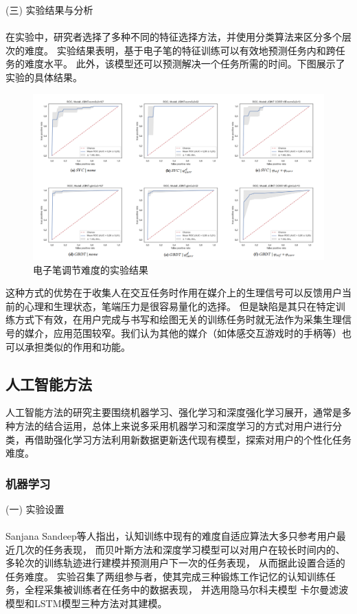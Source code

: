 \documentclass{article}
\begin{document}
            (三) 实验结果与分析\paragraph{}
            在实验中，研究者选择了多种不同的特征选择方法，并使用分类算法来区分多个层次的难度。
            实验结果表明，基于电子笔的特征训练可以有效地预测任务内和跨任务的难度水平。
            此外，该模型还可以预测解决一个任务所需的时间。下图展示了实验的具体结果。

            \begin{figure}[H]
        
            	\centering
            	\includegraphics[scale=0.3]{images/pen_result.png}
            	\caption{电子笔调节难度的实验结果}
            	\label{fig:label}
            \end{figure}

            这种方式的优势在于收集人在交互任务时作用在媒介上的生理信号可以反馈用户当前的心理和生理状态，笔端压力是很容易量化的选择。
            但是缺陷是其只在特定训练方式下有效，在用户完成与书写和绘图无关的训练任务时就无法作为采集生理信号的媒介，应用范围较窄。我们认为其他的媒介（如体感交互游戏时的手柄等）也可以承担类似的作用和功能。
            


            
        \subsection{人工智能方法}
        人工智能方法的研究主要围绕机器学习、强化学习和深度强化学习展开，通常是多种方法的结合运用，总体上来说多采用机器学习和深度学习的方式对用户进行分类，再借助强化学习方法利用新数据更新迭代现有模型，探索对用户的个性化任务难度。
            \subsubsection{机器学习}
            (一) 实验设置\paragraph{}
            Sanjana Sandeep等人指出，认知训练中现有的难度自适应算法大多只参考用户最近几次的任务表现，
            而贝叶斯方法和深度学习模型可以对用户在较长时间内的、多轮次的训练轨迹进行建模并预测用户下一次的任务表现，
            从而据此设置合适的任务难度。
            实验召集了两组参与者，使其完成三种锻炼工作记忆的认知训练任务，全程采集被训练者在任务中的数据表现，
            并选用隐马尔科夫模型 卡尔曼滤波模型和LSTM模型三种方法对其建模。
\end{document}
